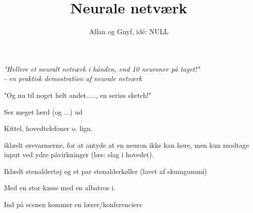 \documentclass[a4paper,11pt]{article}
\title{Neurale netværk}
\author{Allan og Gnyf, id\'e: NULL}
\begin{document}
\maketitle

{\large \em
"Hellere et neuralt netværk i hånden, end 10 neuroner på taget!"\\
- en praktisk demostration af neurale netværk

\bigskip

"Og nu til noget helt andet....., en seriøs sketch!"
}

\begin{roles}

Ser meget lærd (og ...) ud

Kittel, hovedtelefoner o. lign.

iklædt ørevarmerne, for at antyde at en
neuron ikke kan høre, men kun modtage input ved ydre påvirkninger
(læs: slag i hovedet).

Iklædt
stenaldertøj og et par stenalderkøller (lavet af skumgummi) 

Med en stor kasse med en albatros i.

\end{roles}



\scene
Ind på scenen kommer en lærer/konferenciers
\end{document}
